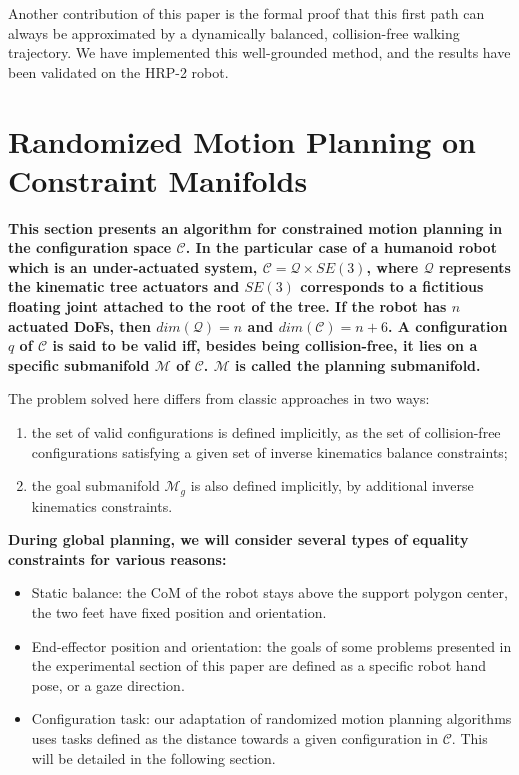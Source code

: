 \documentclass{article}
\newcommand\manifold{\mathcal{M}}
\newcommand\goalmanifold{\mathcal{M}_{g}}
\begin{document}
Another contribution of this paper is the formal proof that this first
path can always be approximated by a dynamically balanced,
collision-free walking trajectory. We have implemented this
well-grounded method, and the results have been validated on the HRP-2
robot.

\section{Randomized Motion Planning on Constraint Manifolds}
\label{sec:wb}

\textbf{This section presents an algorithm for constrained motion
  planning in the configuration space $\mathcal{C}$. In the particular
  case of a humanoid robot which is an under-actuated system,
  $\mathcal{C}=\mathcal{Q} \times SE(3)$, where $\mathcal{Q}$
  represents the kinematic tree actuators and $SE(3)$ corresponds to a
  fictitious floating joint attached to the root of the tree. If the
  robot has $n$ actuated DoFs, then $dim(\mathcal{Q})=n$ and
  $dim(\mathcal{C})=n+6$. A configuration $q$ of $\mathcal{C}$ is said
  to be valid iff, besides being collision-free, it lies on a specific
  submanifold $\manifold$ of $\mathcal{C}$. $\manifold$ is called
  the planning submanifold.}

The problem solved here differs from classic approaches in two ways:
\begin{enumerate}
\item the set of valid configurations is defined implicitly, as the
  set of collision-free configurations satisfying a given set of
  inverse kinematics balance constraints;
\item the goal submanifold $\goalmanifold$ is also defined implicitly,
  by additional inverse kinematics constraints.
\end{enumerate}
\textbf{During global planning, we will consider several types of
equality constraints for various reasons:}
\begin{itemize}
\item Static balance: the CoM of the robot stays above
  the support polygon center, the two feet have fixed position and
  orientation.
\item End-effector position and orientation: the goals of some problems presented
  in the experimental section of this paper are defined as a specific robot hand pose,
  or a gaze direction.
\item Configuration task: our adaptation of randomized motion planning algorithms 
  uses tasks defined as the distance towards a given configuration in $\mathcal{C}$. 
  This will be detailed in the following section.
\end{itemize}
\end{document}
